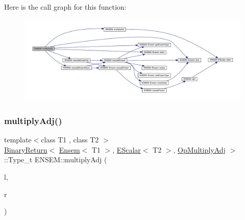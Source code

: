 Here is the call graph for this function\+:\nopagebreak
\begin{figure}[H]
\begin{center}
\leavevmode
\includegraphics[width=350pt]{d1/d9e/group__eensem_gae49707140467f24b7b7a50fad851d99a_cgraph}
\end{center}
\end{figure}
\mbox{\label{group__eensem_ga8ab2ff96201bb49703846d6eb968fd11}} 
\subsubsection{\texorpdfstring{multiplyAdj()}{multiplyAdj()}\hspace{0.1cm}{\footnotesize\ttfamily [2/3]}}
{\footnotesize\ttfamily template$<$class T1 , class T2 $>$ \\
\mbox{\hyperlink{structENSEM_1_1BinaryReturn}{Binary\+Return}}$<$ \mbox{\hyperlink{classENSEM_1_1Ensem}{Ensem}}$<$ T1 $>$, \mbox{\hyperlink{classENSEM_1_1EScalar}{E\+Scalar}}$<$ T2 $>$, \mbox{\hyperlink{structENSEM_1_1OpMultiplyAdj}{Op\+Multiply\+Adj}} $>$\+::Type\+\_\+t E\+N\+S\+E\+M\+::multiply\+Adj (\begin{DoxyParamCaption}\item[{const \mbox{\hyperlink{classENSEM_1_1Ensem}{Ensem}}$<$ T1 $>$ \&}]{l,  }\item[{const \mbox{\hyperlink{classENSEM_1_1EScalar}{E\+Scalar}}$<$ T2 $>$ \&}]{r }\end{DoxyParamCaption})\hspace{0.3cm}{\ttfamily [inline]}}

